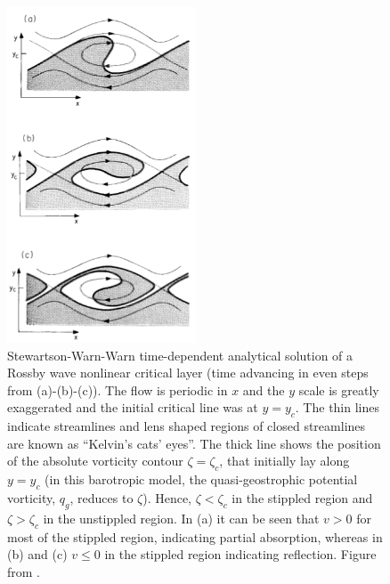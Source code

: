 \begin{figure}
 \centering
 \noindent\includegraphics[width=0.5\textwidth]{figures/chapter-intro/breaking_wave_AHL.png}
 \caption[Results from a Stewartson-Warn-Warn model of wave
 breaking.]{Stewartson-Warn-Warn time-dependent analytical solution of a Rossby
   wave nonlinear critical layer (time advancing in even steps from
   (a)-(b)-(c)). The flow is periodic in $x$ and the $y$ scale is greatly
   exaggerated and the initial critical line was at $y=y_c$. The thin lines
   indicate streamlines and lens shaped regions of closed streamlines are known
   as ``Kelvin's cats' eyes''. The thick line shows the position of the absolute
   vorticity contour $\zeta=\zeta_c$, that initially lay along $y=y_c$ (in this
   barotropic model, the quasi-geostrophic potential vorticity, $q_g$, reduces
   to $\zeta$). Hence, $\zeta<\zeta_c$ in the stippled region and
   $\zeta>\zeta_c$ in the unstippled region. In (a) it can be seen that $v>0$
   for most of the stippled region, indicating partial absorption, whereas in
   (b) and (c) $v\leq0$ in the stippled region indicating reflection. Figure
   from \citet{Andrews1987}.}
 \label{fig:cats_eyes}
\end{figure}

